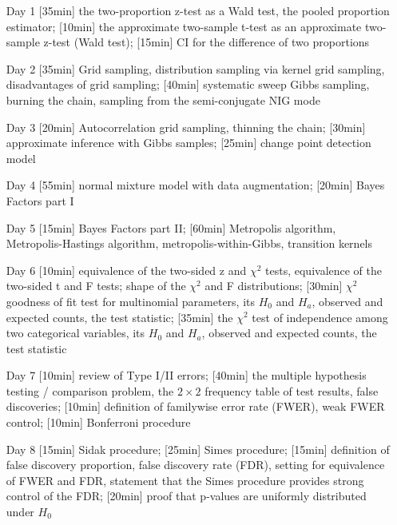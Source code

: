 \begin{enumerate}
\item[Day 1] [35min] the two-proportion z-test as a Wald test, the pooled proportion estimator;  [10min] the approximate two-sample t-test as an approximate two-sample z-test (Wald test); 
[15min] CI for the difference of two proportions

\item[Day 2] [35min] Grid sampling, distribution sampling via kernel grid sampling, disadvantages of grid sampling; [40min] systematic sweep Gibbs sampling, burning the chain, sampling from the semi-conjugate NIG mode

\item[Day 3] [20min] Autocorrelation grid sampling, thinning the chain; [30min] approximate inference with Gibbs samples; [25min] change point detection model  

\item[Day 4] [55min] normal mixture model with data augmentation; [20min] Bayes Factors part I

\item[Day 5] [15min] Bayes Factors part II; [60min] Metropolis algorithm, Metropolis-Hastings algorithm, metropolis-within-Gibbs, transition kernels

\item[Day 6] [10min] equivalence of the two-sided z and $\chi^2$ tests, equivalence of the two-sided t and F tests; shape of the $\chi^2$ and F distributions;  [30min] $\chi^2$ goodness of fit test for multinomial parameters, its $H_0$ and $H_a$, observed and expected counts, the test statistic; [35min] the $\chi^2$ test of independence among two categorical variables, its $H_0$ and $H_a$, observed and expected counts, the test statistic

\item[Day 7] [10min] review of Type I/II errors; [40min] the multiple hypothesis testing / comparison problem, the $2 \times 2$ frequency table of test results, false discoveries; [10min] definition of familywise error rate (FWER), weak FWER control; [10min] Bonferroni procedure 

\item[Day 8] [15min] Sidak procedure; [25min] Simes procedure; [15min] definition of false discovery proportion, false discovery rate (FDR), setting for equivalence of FWER and FDR, statement that the Simes procedure provides strong control of the FDR; [20min] proof that p-values are uniformly distributed under $H_0$


\end{enumerate}
